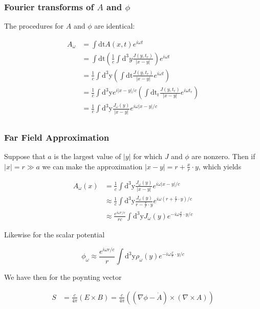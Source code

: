 \documentclass[12pt]{article}
\begin{document}
\subsubsection*{Fourier transforms of \(A\) and \(\phi\)}

The procedures for \(A\) and \(\phi\) are identical:

\begin{align*}
A_\omega &= \int \mathrm{dt} A(x,t)e^{i\omega t}\\
&= \int \mathrm{dt} \left( \frac{1}{c}\int\mathrm{d}^3y\frac{J(y,t_r)}{|x-y|} \right)e^{i\omega t} \\
&= \frac{1}{c}\int \mathrm{d^3y} \left( \int \mathrm{dt} \frac{J(y,t_r)}{|x-y|}e^{i\omega t}  \right) \\
&= \frac{1}{c}\int \mathrm{d^3y} e^{i|x-y|/c}\left( \int \mathrm{dt_r} \frac{J(y,t_r)}{|x-y|}e^{i\omega t_r}  \right)
\\ &= \frac{1}{c}\int \mathrm{d^3y} \frac{J_\omega (y)}{|x-y|}e^{i\omega |x-y|/c} \\
\end{align*}

\subsubsection*{Far Field Approximation}

Suppose that \(a\) is the largest value of \(|y|\) for which \(J\) and \(\phi\) are nonzero. Then if \(|x| = r \gg a\) we can make the approximation \(|x-y| = r + \frac{x}{r}\cdot y\), which yields 

\begin{align*}
A_\omega(x) &= \frac{1}{c}\int \mathrm{d^3y} \frac{J_\omega (y)}{|x-y|}e^{i\omega |x-y|/c} \\
&\approx \frac{1}{c}\int \mathrm{d^3y} \frac{J_\omega (y)}{r - \frac{x}{r}\cdot y}e^{i\omega (r + \frac{x}{r}\cdot y)/c} \\
&\approx \frac{e^{i\omega r/c}}{rc}\int \mathrm{d^3y} J_\omega (y)e^{-i\omega \frac{x}{r}\cdot y/c}
\end{align*}

Likewise for the scalar potential

\[ \phi_\omega \approx \frac{e^{i\omega r/c}}{r}\int \mathrm{d^3y} \rho_\omega (y)e^{-i\omega \frac{x}{r}\cdot y/c}
\]

We have then for the poynting vector

\begin{align*}
S &= \frac{c}{4\pi}(E \times B)  = \frac{c}{4\pi} ((\nabla \phi - \dot{A}) \times (\nabla \times A))
\end{align*}
\end{document}
